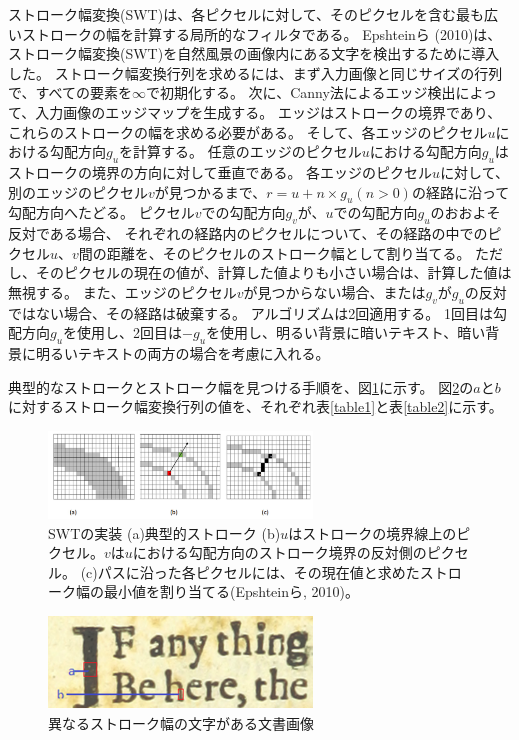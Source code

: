 \documentclass[uplatex, twocolumn,10pt]{jsarticle}
\begin{document}
ストローク幅変換(SWT)は、各ピクセルに対して、そのピクセルを含む最も広いストロークの幅を計算する局所的なフィルタである。
Epshteinら (2010)は、ストローク幅変換(SWT)を自然風景の画像内にある文字を検出するために導入した。
ストローク幅変換行列を求めるには、まず入力画像と同じサイズの行列で、すべての要素を$\infty$で初期化する。
次に、Canny法によるエッジ検出によって、入力画像のエッジマップを生成する。
エッジはストロークの境界であり、これらのストロークの幅を求める必要がある。
そして、各エッジのピクセル$u$における勾配方向$g_u$を計算する。
任意のエッジのピクセル$u$における勾配方向$g_u$はストロークの境界の方向に対して垂直である。
各エッジのピクセル$u$に対して、別のエッジのピクセル$v$が見つかるまで、$r = u + n \times g_u(n > 0)$の経路に沿って勾配方向へたどる。
ピクセル$v$での勾配方向$g_v$が、$u$での勾配方向$g_u$のおおよそ反対である場合、
それぞれの経路内のピクセルについて、その経路の中でのピクセル$u$、$v$間の距離を、そのピクセルのストローク幅として割り当てる。
ただし、そのピクセルの現在の値が、計算した値よりも小さい場合は、計算した値は無視する。
また、エッジのピクセル$v$が見つからない場合、または$g_v$が$g_u$の反対ではない場合、その経路は破棄する。
アルゴリズムは2回適用する。
1回目は勾配方向$g_u$を使用し、2回目は$−g_u$を使用し、明るい背景に暗いテキスト、暗い背景に明るいテキストの両方の場合を考慮に入れる。

典型的なストロークとストローク幅を見つける手順を、図\ref{fig1}に示す。
図\ref{fig2}の$a$と$b$に対するストローク幅変換行列の値を、それぞれ表\ref{table1}と表\ref{table2}に示す。


\begin{figure}[tp]
    \begin{center}
        \includegraphics*[width=7cm]{image/master/Fig1.png}
        \caption{SWTの実装 (a)典型的ストローク (b)$u$はストロークの境界線上のピクセル。$v$は$u$における勾配方向のストローク境界の反対側のピクセル。
            (c)パスに沿った各ピクセルには、その現在値と求めたストローク幅の最小値を割り当てる(Epshteinら, 2010)。}
        \label{fig1}
    \end{center}
\end{figure}

\begin{figure}[tp]
    \begin{center}
        \includegraphics*[width=7cm]{image/master/Fig2.png}
        \caption{異なるストローク幅の文字がある文書画像}
        \label{fig2}
    \end{center}
\end{figure}
\end{document}
